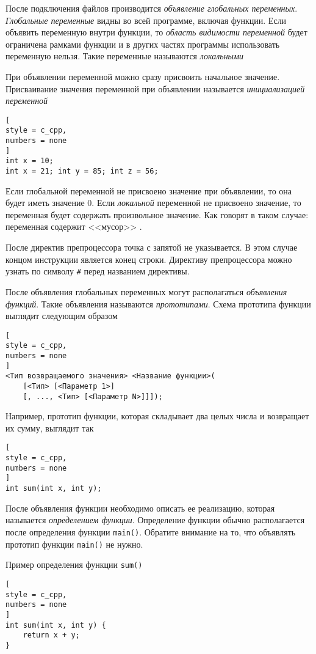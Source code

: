 \documentclass[%
	11pt,
	a4paper,
	utf8,
		]{article}
\begin{document}
После подключения файлов производится \emph{объявление глобальных переменных}. \emph{Глобальные переменные} видны во всей программе, включая функции. Если объявить переменную внутри функции, то \emph{область видимости переменной} будет ограничена рамками функции и в других частях программы использовать переменную нельзя. Такие переменные называются \emph{локальными}

При объявлении переменной можно сразу присвоить начальное значение. Присваивание значения переменной при объявлении называется \emph{инициализацией переменной}
\begin{lstlisting}[
style = c_cpp,
numbers = none
]
int x = 10;
int x = 21; int y = 85; int z = 56;
\end{lstlisting}

Если глобальной переменной не присвоено значение при объявлении, то она будет иметь значение 0. Если \emph{локальной} переменной не присвоено значение, то переменная будет содержать {\color{red}произвольное значение}. Как говорят в таком случае: переменная содержит <<мусор>> \cite[]{prokhorenok-prog-c:2020}.

После директив препроцессора точка с запятой не указывается. В этом случае концом инструкции является конец строки. Директиву препроцессора можно узнать по символу \verb|#| перед названием директивы. 

После объявления глобальных переменных могут располагаться \emph{объявления функций}. Такие объявления называются \emph{прототипами}. Схема прототипа функции выглядит следующим образом
\begin{lstlisting}[
style = c_cpp,
numbers = none
]
<Тип возвращаемого значения> <Название функции>(
    [<Тип> [<Параметр 1>]
    [, ..., <Тип> [<Параметр N>]]]);
\end{lstlisting}

Например, прототип функции, которая складывает два целых числа и возвращает их сумму, выглядит так
\begin{lstlisting}[
style = c_cpp,
numbers = none
]
int sum(int x, int y);
\end{lstlisting}

После объявления функции необходимо описать ее реализацию, которая называется \emph{определением функции}. Определение функции обычно располагается после определения функции \verb|main()|. Обратите внимание на то, что объявлять прототип функции \verb|main()| не нужно.

Пример определения функции \verb|sum()|
\begin{lstlisting}[
style = c_cpp,
numbers = none
]
int sum(int x, int y) {
    return x + y;
}
\end{lstlisting}
\end{document}
